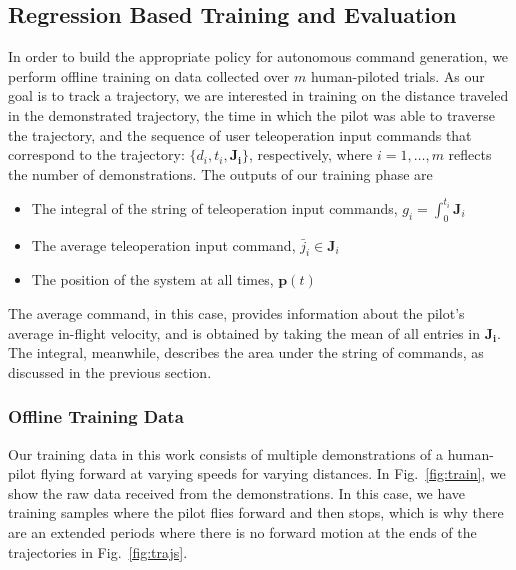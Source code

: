 \documentclass[letterpaper, 10 pt, conference]{ieeeconf}  %
\newcommand\NB[1]{$\spadesuit$\footnote{NB: #1}}
\begin{document}
\subsection{Regression Based Training and Evaluation} \label{sec:train}
In order to build the appropriate policy for autonomous command generation, we perform offline training on data collected over $m$ human-piloted trials. As our goal is to track a trajectory, we are interested in training on the distance traveled in the demonstrated trajectory, the time in which the pilot was able to traverse the trajectory, and the sequence of user teleoperation input commands that correspond to the trajectory: $\{d_i,t_i,\mathbf{J_i}\}$, respectively, where $i=1,\ldots,m$ reflects the number of demonstrations. %
The outputs of our training phase are \begin{itemize} %
    \item The integral of the string of teleoperation input commands, $g_i = \int_0^{t_i}\mathbf{J}_i$
    \item The average teleoperation input command, $\bar{j}_i \in \mathbf{J}_i$
    \item The position of the system at all times, $\mathbf{p}(t)$
\end{itemize}
The average command, in this case, provides information about the pilot's average in-flight velocity, and is obtained by taking the mean of all entries in $\mathbf{J_i}$. The integral, meanwhile, describes the area under the string of commands, as discussed in the previous section.

\subsubsection{Offline Training Data}

Our training data in this work consists of multiple demonstrations of a human-pilot flying forward at varying speeds for varying distances. In Fig.~\ref{fig:train}, we show the raw data received from the demonstrations. In this case, we have training samples where the pilot flies forward and then stops, which is why there are an extended periods where there is no forward motion at the ends of the trajectories in Fig.~\ref{fig:trajs}.
\end{document}
